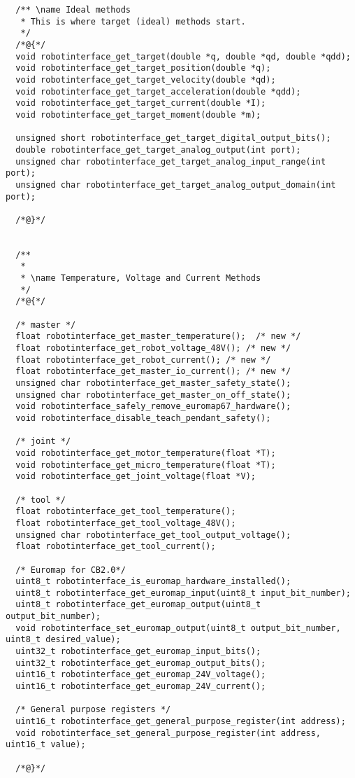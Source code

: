 \documentclass[
a4paper,
12pt,
oneside,
headsepline,		%
footsepline,		%
]{scrbook}
\begin{document}
\begin{lstlisting}
  /** \name Ideal methods
   * This is where target (ideal) methods start.
   */
  /*@{*/
  void robotinterface_get_target(double *q, double *qd, double *qdd);
  void robotinterface_get_target_position(double *q);
  void robotinterface_get_target_velocity(double *qd);
  void robotinterface_get_target_acceleration(double *qdd);
  void robotinterface_get_target_current(double *I);
  void robotinterface_get_target_moment(double *m);

  unsigned short robotinterface_get_target_digital_output_bits();
  double robotinterface_get_target_analog_output(int port);
  unsigned char robotinterface_get_target_analog_input_range(int port);
  unsigned char robotinterface_get_target_analog_output_domain(int port);

  /*@}*/


  /**
   *
   * \name Temperature, Voltage and Current Methods
   */
  /*@{*/

  /* master */
  float robotinterface_get_master_temperature();  /* new */
  float robotinterface_get_robot_voltage_48V(); /* new */
  float robotinterface_get_robot_current(); /* new */
  float robotinterface_get_master_io_current(); /* new */
  unsigned char robotinterface_get_master_safety_state();
  unsigned char robotinterface_get_master_on_off_state();
  void robotinterface_safely_remove_euromap67_hardware();
  void robotinterface_disable_teach_pendant_safety();

  /* joint */
  void robotinterface_get_motor_temperature(float *T);
  void robotinterface_get_micro_temperature(float *T);
  void robotinterface_get_joint_voltage(float *V);

  /* tool */
  float robotinterface_get_tool_temperature();
  float robotinterface_get_tool_voltage_48V();
  unsigned char robotinterface_get_tool_output_voltage();
  float robotinterface_get_tool_current();

  /* Euromap for CB2.0*/
  uint8_t robotinterface_is_euromap_hardware_installed();
  uint8_t robotinterface_get_euromap_input(uint8_t input_bit_number);
  uint8_t robotinterface_get_euromap_output(uint8_t output_bit_number);
  void robotinterface_set_euromap_output(uint8_t output_bit_number, uint8_t desired_value);
  uint32_t robotinterface_get_euromap_input_bits();
  uint32_t robotinterface_get_euromap_output_bits();
  uint16_t robotinterface_get_euromap_24V_voltage();
  uint16_t robotinterface_get_euromap_24V_current();

  /* General purpose registers */
  uint16_t robotinterface_get_general_purpose_register(int address);
  void robotinterface_set_general_purpose_register(int address, uint16_t value);

  /*@}*/
\end{lstlisting}
\end{document}
